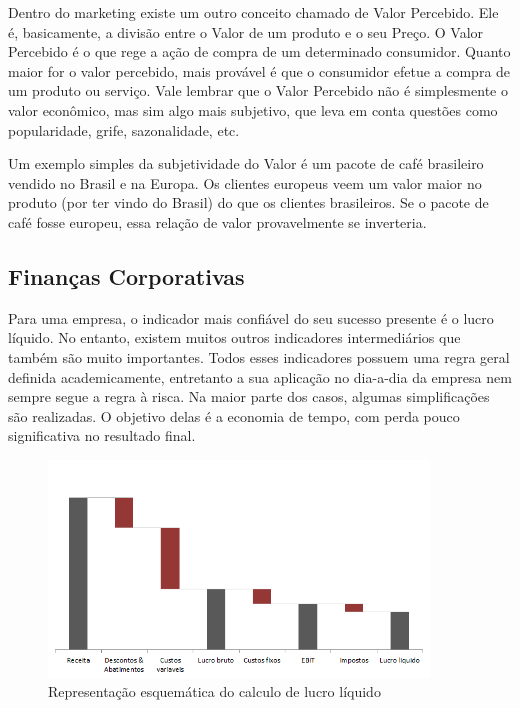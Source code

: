 \documentclass[12pt]{article}
\begin{document}
	Dentro do marketing existe um outro conceito chamado de Valor Percebido. Ele é, basicamente, a divisão entre o Valor de um produto e o seu Preço. O Valor Percebido é o que rege a ação de compra de um determinado consumidor. Quanto maior for o valor percebido, mais provável é que o consumidor efetue a compra de um produto ou serviço. Vale lembrar que o Valor Percebido não é simplesmente o valor econômico, mas sim algo mais subjetivo, que leva em conta questões como popularidade, grife, sazonalidade, etc.

	Um exemplo simples da subjetividade do Valor é um pacote de café brasileiro vendido no Brasil e na Europa. Os clientes europeus veem um valor maior no produto (por ter vindo do Brasil) do que os clientes brasileiros. Se o pacote de café fosse europeu, essa relação de valor provavelmente se inverteria.

\subsection{Finanças Corporativas}

	Para uma empresa, o indicador mais confiável do seu sucesso presente é o lucro líquido. No entanto, existem muitos outros indicadores intermediários que também são muito importantes. Todos esses indicadores possuem uma regra geral definida academicamente, entretanto a sua aplicação no dia-a-dia da empresa nem sempre segue a regra à risca. Na maior parte dos casos, algumas simplificações são realizadas. O objetivo delas é a economia de tempo, com perda pouco significativa no resultado final.

\begin{figure}[h!]
	\centering
	\includegraphics[width=0.9\textwidth]{img/finance.png}
	\caption{Representação esquemática do calculo de lucro líquido}
	\label{fig:lucro}
\end{figure}
\end{document}
